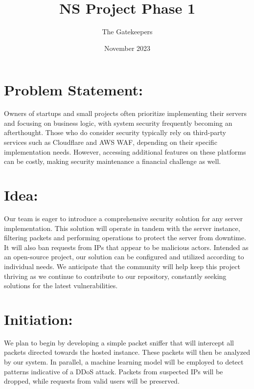 \documentclass{article}
\title{NS Project Phase 1}
\author{The Gatekeepers}
\date{November 2023}
\begin{document}
\maketitle

\section{Problem Statement:}

Owners of startups and small projects often prioritize implementing their servers and focusing on business logic, with system security frequently becoming an afterthought. Those who do consider security typically rely on third-party services such as Cloudflare and AWS WAF, depending on their specific implementation needs. However, accessing additional features on these platforms can be costly, making security maintenance a financial challenge as well. 

\section{Idea:}

Our team is eager to introduce a comprehensive security solution for any server implementation. This solution will operate in tandem with the server instance, filtering packets and performing operations to protect the server from downtime. It will also ban requests from IPs that appear to be malicious actors. Intended as an open-source project, our solution can be configured and utilized according to individual needs. We anticipate that the community will help keep this project thriving as we continue to contribute to our repository, constantly seeking solutions for the latest vulnerabilities. 

\section{Initiation:}

We plan to begin by developing a simple packet sniffer that will intercept all packets directed towards the hosted instance. These packets will then be analyzed by our system. In parallel, a machine learning model will be employed to detect patterns indicative of a DDoS attack. Packets from suspected IPs will be dropped, while requests from valid users will be preserved. 
\end{document}
